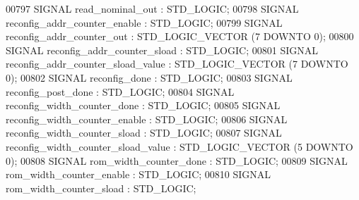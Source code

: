 \begin{DoxyCode}
{00797      \textcolor{keywordflow}{SIGNAL}  \textcolor{vhdlchar}{read_nominal_out} \textcolor{vhdlchar}{:} \textcolor{comment}{STD\_LOGIC};
00798      \textcolor{keywordflow}{SIGNAL}  \textcolor{vhdlchar}{reconfig_addr_counter_enable} \textcolor{vhdlchar}{:} \textcolor{comment}{STD\_LOGIC};
00799      \textcolor{keywordflow}{SIGNAL}  \textcolor{vhdlchar}{reconfig_addr_counter_out} \textcolor{vhdlchar}{:}    \textcolor{comment}{STD\_LOGIC\_VECTOR} \textcolor{vhdlchar}{(}\textcolor{vhdllogic}{}\textcolor{vhdllogic}{7} \textcolor{keywordflow}{DOWNTO} \textcolor{vhdllogic}{}\textcolor{vhdllogic}{0}\textcolor{vhdlchar}{)};
00800      \textcolor{keywordflow}{SIGNAL}  \textcolor{vhdlchar}{reconfig_addr_counter_sload} \textcolor{vhdlchar}{:}  \textcolor{comment}{STD\_LOGIC};
00801      \textcolor{keywordflow}{SIGNAL}  \textcolor{vhdlchar}{reconfig_addr_counter_sload_value} \textcolor{vhdlchar}{:}    \textcolor{comment}{STD\_LOGIC\_VECTOR} \textcolor{vhdlchar}{(}\textcolor{vhdllogic}{}\textcolor{vhdllogic}{7} \textcolor{keywordflow}{DOWNTO} \textcolor{vhdllogic}{}\textcolor{vhdllogic}{0}\textcolor{vhdlchar}{)};
00802      \textcolor{keywordflow}{SIGNAL}  \textcolor{vhdlchar}{reconfig_done} \textcolor{vhdlchar}{:}    \textcolor{comment}{STD\_LOGIC};
00803      \textcolor{keywordflow}{SIGNAL}  \textcolor{vhdlchar}{reconfig_post_done} \textcolor{vhdlchar}{:}   \textcolor{comment}{STD\_LOGIC};
00804      \textcolor{keywordflow}{SIGNAL}  \textcolor{vhdlchar}{reconfig_width_counter_done} \textcolor{vhdlchar}{:}  \textcolor{comment}{STD\_LOGIC};
00805      \textcolor{keywordflow}{SIGNAL}  \textcolor{vhdlchar}{reconfig_width_counter_enable} \textcolor{vhdlchar}{:}    \textcolor{comment}{STD\_LOGIC};
00806      \textcolor{keywordflow}{SIGNAL}  \textcolor{vhdlchar}{reconfig_width_counter_sload} \textcolor{vhdlchar}{:} \textcolor{comment}{STD\_LOGIC};
00807      \textcolor{keywordflow}{SIGNAL}  \textcolor{vhdlchar}{reconfig_width_counter_sload_value} \textcolor{vhdlchar}{:}   \textcolor{comment}{STD\_LOGIC\_VECTOR} \textcolor{vhdlchar}{(}\textcolor{vhdllogic}{}\textcolor{vhdllogic}{5} \textcolor{keywordflow}{DOWNTO} \textcolor{vhdllogic}{}\textcolor{vhdllogic}{0}\textcolor{vhdlchar}{)};
00808      \textcolor{keywordflow}{SIGNAL}  \textcolor{vhdlchar}{rom_width_counter_done} \textcolor{vhdlchar}{:}   \textcolor{comment}{STD\_LOGIC};
00809      \textcolor{keywordflow}{SIGNAL}  \textcolor{vhdlchar}{rom_width_counter_enable} \textcolor{vhdlchar}{:} \textcolor{comment}{STD\_LOGIC};
00810      \textcolor{keywordflow}{SIGNAL}  \textcolor{vhdlchar}{rom_width_counter_sload} \textcolor{vhdlchar}{:}  \textcolor{comment}{STD\_LOGIC};
}
\end{DoxyCode}
